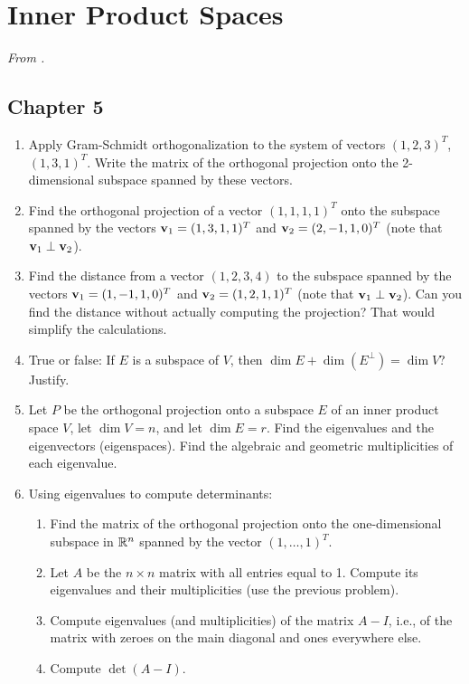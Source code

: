 \documentclass[../psets.tex]{subfiles}
\begin{document}
\section{Inner Product Spaces}
\emph{From \textcite{bib:Treil}.}
\subsection*{Chapter 5}
\begin{enumerate}[label={\textbf{3.\arabic*.}}]
    \item {}Apply Gram-Schmidt orthogonalization to the system of vectors $(1,2,3)^T$, $(1,3,1)^T$. Write the matrix of the orthogonal projection onto the 2-dimensional subspace spanned by these vectors.
    \setcounter{enumi}{4}
    \item Find the orthogonal projection of a vector $(1,1,1,1)^T$ onto the subspace spanned by the vectors $\mathbf{v}_1=(1,3,1,1)^T$ and $\mathbf{v}_2=(2,-1,1,0)^T$ (note that $\mathbf{v}_1\perp\mathbf{v}_2$).
    \item Find the distance from a vector $(1,2,3,4)$ to the subspace spanned by the vectors $\mathbf{v}_1=(1,-1,1,0)^T$ and $\mathbf{v}_2=(1,2,1,1)^T$ (note that $\mathbf{v}_1\perp\mathbf{v}_2$). Can you find the distance without actually computing the projection? That would simplify the calculations.
    \item True or false: If $E$ is a subspace of $V$, then $\dim E+\dim(E^\perp)=\dim V$? Justify.
    \item Let $P$ be the orthogonal projection onto a subspace $E$ of an inner product space $V$, let $\dim V=n$, and let $\dim E=r$. Find the eigenvalues and the eigenvectors (eigenspaces). Find the algebraic and geometric multiplicities of each eigenvalue.
    \item Using eigenvalues to compute determinants:
    \begin{enumerate}
        \item Find the matrix of the orthogonal projection onto the one-dimensional subspace in $\mathbb{R}^n$ spanned by the vector $(1,\dots,1)^T$.
        \item Let $A$ be the $n\times n$ matrix with all entries equal to 1. Compute its eigenvalues and their multiplicities (use the previous problem).
        \item Compute eigenvalues (and multiplicities) of the matrix $A-I$, i.e., of the matrix with zeroes on the main diagonal and ones everywhere else.
        \item Compute $\det(A-I)$.
    \end{enumerate}

\end{enumerate}
\end{document}
